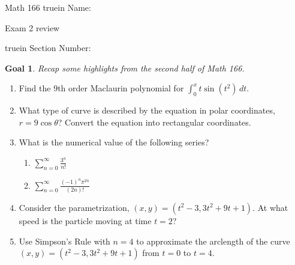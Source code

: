\documentclass[12pt]{article}
\newtheorem*{goal}{Goal}
\begin{document}
\pagestyle{empty} %

\noindent
{Math 166  truein  Name:\ \hrulefill}

\noindent
{Exam 2 review}

\noindent  {} truein  Section Number:\ \hrulefill
\medskip

\begin{goal} \rm
Recap some highlights from the second half of Math 166.
\end{goal}
\begin{enumerate}
\item Find the 9th order Maclaurin polynomial for $\displaystyle \int_0^x t\sin(t^2)\, dt$.
\vfill
\item What type of curve is described by the equation in polar coordinates, $r = 9\cos\theta$?  Convert the equation into rectangular coordinates.
\vfill
\item What is the numerical value of the following series?
\begin{enumerate}
\item $\displaystyle \sum_{n = 0}^\infty \frac{3^n}{n!}$
\vspace{.5 in}
\item $\displaystyle \sum_{n = 0}^\infty \frac{(-1)^n \pi^{2n}}{(2n)!}$
\vspace{.5 in}
\end{enumerate}
\newpage
\item Consider the parametrization, $(x, y) = (t^2 - 3, 3t^2 + 9t + 1)$.  At what speed is the particle moving at time $t = 2$?
\vfill
\item Use Simpson's Rule with $n = 4$ to approximate the arclength of the curve $(x, y) = (t^2 - 3, 3t^2 + 9t + 1)$ from $t = 0$ to $t = 4$.
\vfill
\end{enumerate}
\end{document}
